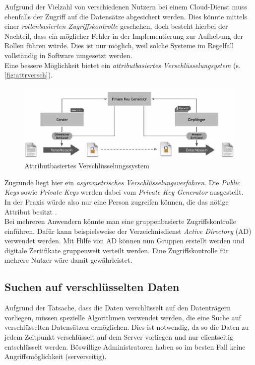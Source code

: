 \documentclass[conference]{IEEEtran}
\begin{document}
Aufgrund der Vielzahl von verschiedenen Nutzern bei einem Cloud-Dienst muss ebenfalls der Zugriff auf die Datensätze abgesichert werden. Dies könnte mittels einer \textit{rollenbasierten Zugriffskontrolle} geschehen, doch besteht hierbei der Nachteil, dass ein möglicher Fehler in der Implementierung zur Aufhebung der Rollen führen würde. Dies ist nur möglich, weil solche Systeme im Regelfall vollständig in Software umgesetzt werden.\\
Eine bessere Möglichkeit bietet ein \textit{attributbasiertes Verschlüsselungsystem} (s. \autoref{fig:attrversch}).  
\begin{figure}
\centering
\includegraphics[width=1.5\columnwidth]{attr}
\caption{Attributbasiertes Verschlüsselungssystem}
\label{fig:attrversch}
\end{figure}

Zugrunde liegt hier ein \textit{asymmetrisches Verschlüsselungsverfahren}. Die \textit{Public Keys} sowie \textit{Private Keys} werden dabei vom \textit{Private Key Generator} ausgestellt.\\
In der Praxis würde also nur eine Person zugreifen können, die das nötige Attribut besitzt \cite{eckert2015}.\\
Bei mehreren Anwendern könnte man eine gruppenbasierte Zugriffskontrolle einführen. Dafür kann beispielsweise der Verzeichnisdienst \textit{Active Directory} (AD) verwendet werden. Mit Hilfe von AD können nun Gruppen erstellt werden und digitale Zertifikate gruppenweit verteilt werden. Eine Zugriffskontrolle für mehrere Nutzer wäre damit gewährleistet.\\

\subsection{Suchen auf verschlüsselten Daten}
Aufgrund der Tatsache, dass die Daten verschlüsselt auf den Datenträgern vorliegen, müssen spezielle Algorithmen verwendet werden, die eine Suche auf verschlüsselten Datensätzen ermöglichen. Dies ist notwendig, da so die Daten zu jedem Zeitpunkt verschlüsselt auf dem Server vorliegen und nur clientseitig entschlüsselt werden. Böswillige Administratoren haben so im besten Fall keine Angriffsmöglichkeit (serverseitig).\\
\end{document}
